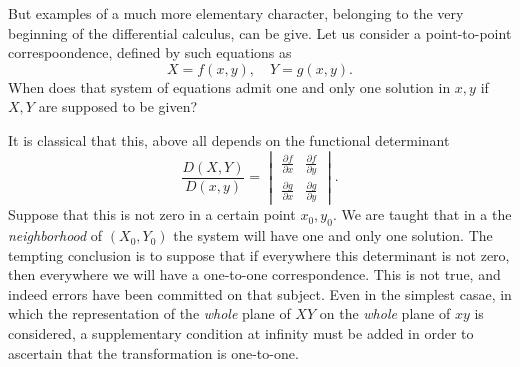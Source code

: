 \documentclass[12pt,oneside]{book}
\begin{document}
But examples of a much more elementary character, belonging to the very beginning of the differential calculus, can be give. Let us consider a point-to-point correspoondence, defined by such equations as 
$$X=f(x,y),\quad Y=g(x,y).$$
When does that system of equations admit one and only one solution in $x,y$ if $X, Y$ are supposed to be given? \par 

It is classical that this, above all depends on the functional determinant 
$$\frac{D(X,Y)}{D(x,y)}=
    \begin{vmatrix}
        \frac{\partial f}{\partial x} & \frac{\partial f}{\partial y} \\[0.3em]
        \frac{\partial g}{\partial x} & \frac{\partial g}{\partial y}
    \end{vmatrix}. $$
Suppose that this is not zero in a certain point $x_0,y_0$. We are taught that in a the \textit{neighborhood} of $(X_0,Y_0)$ the system will have one and only one solution. The tempting conclusion is to suppose that if everywhere this determinant is not zero, then everywhere we will have a one-to-one correspondence. This is not true, and indeed errors have been committed on that subject. Even in the simplest casae, in which the representation of the \textit{whole} plane of $XY$ on the \textit{whole} plane of $xy$ is considered, a supplementary condition at infinity must be added in order to ascertain that the transformation is one-to-one. \par 
\end{document}
